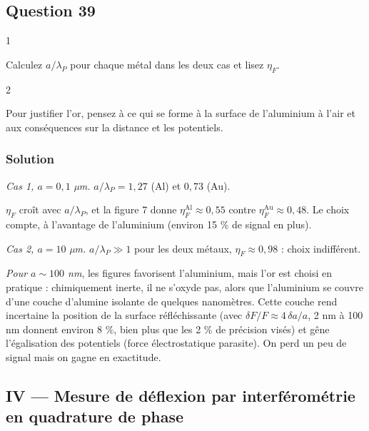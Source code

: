 \documentclass[11pt,a4paper]{article}
\begin{document}
\hypertarget{question-39}{%
\subsection{Question 39}\label{question-39}}

\begin{indication}{1}

Calculez \(a/\lambda_P\) pour chaque métal dans les deux cas et lisez \(\eta_F\).

\end{indication}

\begin{indication}{2}

Pour justifier l'or, pensez à ce qui se forme à la surface de l'aluminium à l'air et aux conséquences sur la distance et les potentiels.

\end{indication}

\hypertarget{solution-38}{%
\subsubsection{Solution}\label{solution-38}}

\emph{Cas 1, \(a=0{,}1\) µm.} \(a/\lambda_P=1{,}27\) (Al) et \(0{,}73\) (Au).

\(\eta_F\) croît avec \(a/\lambda_P\), et la figure 7 donne \(\eta_F^{\mathrm{Al}}\approx0{,}55\) contre \(\eta_F^{\mathrm{Au}}\approx0{,}48\). Le choix compte, à l'avantage de l'aluminium (environ 15 \% de signal en plus).

\emph{Cas 2, \(a=10\) µm.} \(a/\lambda_P\gg1\) pour les deux métaux, \(\eta_F\approx0{,}98\) : choix indifférent.

\emph{Pour \(a\sim100\) nm}, les figures favorisent l'aluminium, mais l'or est choisi en pratique : chimiquement inerte, il ne s'oxyde pas, alors que l'aluminium se couvre d'une couche d'alumine isolante de quelques nanomètres. Cette couche rend incertaine la position de la surface réfléchissante (avec \(\delta F/F\approx4\,\delta a/a\), 2 nm à 100 nm donnent environ 8 \%, bien plus que les 2 \% de précision visés) et gêne l'égalisation des potentiels (force électrostatique parasite). On perd un peu de signal mais on gagne en exactitude.

\hypertarget{iv-mesure-de-duxe9flexion-par-interfuxe9romuxe9trie-en-quadrature-de-phase}{%
\subsection{IV --- Mesure de déflexion par interférométrie en quadrature de phase}\label{iv-mesure-de-duxe9flexion-par-interfuxe9romuxe9trie-en-quadrature-de-phase}}
\end{document}
